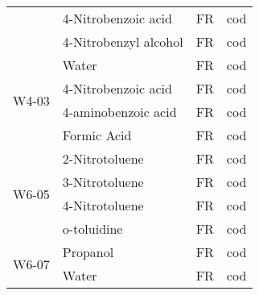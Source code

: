 \begin{table}[]
\begin{tabular}{@{}llll@{}}
                       & 4-Nitrobenzoic acid     & FR                                                                 & cod                                                         \\
                       & 4-Nitrobenzyl alcohol   & FR                                                                 & cod                                                         \\
\multirow{4}{*}{W4-03} & Water                   & FR                                                                 & cod                                                         \\
                       & 4-Nitrobenzoic acid     & FR                                                                 & cod                                                         \\
                       & 4-aminobenzoic acid     & FR                                                                 & cod                                                         \\
                       & Formic Acid             & FR                                                                 & cod                                                         \\
\multirow{4}{*}{W6-05} & 2-Nitrotoluene          & FR                                                                 & cod                                                         \\
                       & 3-Nitrotoluene          & FR                                                                 & cod                                                         \\
                       & 4-Nitrotoluene          & FR                                                                 & cod                                                         \\
                       & o-toluidine             & FR                                                                 & cod                                                         \\
\multirow{2}{*}{W6-07} & Propanol                & FR                                                                 & cod                                                         \\
                       & Water                   & FR                                                                 & cod                                                         \\ \cmidrule(l){2-4} 
\end{tabular}
\end{table}


